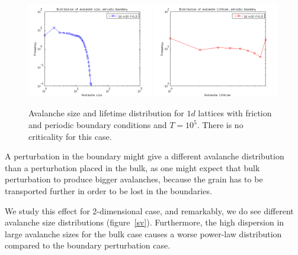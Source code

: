 \begin{figure} 
\begin{center}
\includegraphics[width=0.49\textwidth]{results/1sp.png}
\includegraphics[width=0.49\textwidth]{results/1tp.png} 
\caption{Avalanche size and lifetime distribution for $1d$ lattices with friction and periodic boundary conditions and $T=10^5$. There is no criticality for this case. }
\label{1p}
\end{center}
\end{figure} 








A perturbation in the boundary might give a different avalanche distribution than a perturbation placed in the bulk,
as one might expect that bulk perturbation to produce bigger avalanches, 
because the grain has to be transported further in order to be lost in the boundaries.

We study this effect for 2-dimensional case, and remarkably, we do see different avalanche size distributions (figure~\ref{sv}). 
Furthermore, the high dispersion in large avalanche sizes for the bulk case causes a worse power-law distribution compared to the boundary perturbation case.

